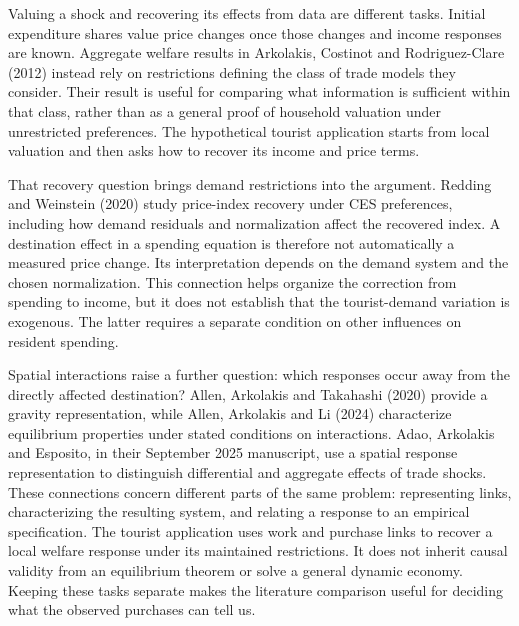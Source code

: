Valuing a shock and recovering its effects from data are different tasks. Initial
expenditure shares value price changes once those changes and income responses
are known. Aggregate welfare results in Arkolakis, Costinot and Rodriguez-Clare
(2012) instead rely on restrictions defining the class of trade models they
consider. Their result is useful for comparing what information is sufficient
within that class, rather than as a general proof of household valuation under
unrestricted preferences. The hypothetical tourist application starts from local
valuation and then asks how to recover its income and price terms.

That recovery question brings demand restrictions into the argument. Redding and
Weinstein (2020) study price-index recovery under CES preferences, including how
demand residuals and normalization affect the recovered index. A destination
effect in a spending equation is therefore not automatically a measured price
change. Its interpretation depends on the demand system and the chosen
normalization. This connection helps organize the correction from spending to
income, but it does not establish that the tourist-demand variation is exogenous.
The latter requires a separate condition on other influences on resident spending.

Spatial interactions raise a further question: which responses occur away from
the directly affected destination? Allen, Arkolakis and Takahashi (2020) provide
a gravity representation, while Allen, Arkolakis and Li (2024) characterize
equilibrium properties under stated conditions on interactions. Adao, Arkolakis
and Esposito, in their September 2025 manuscript, use a spatial response
representation to distinguish differential and aggregate effects of trade shocks.
These connections concern different parts of the same problem: representing
links, characterizing the resulting system, and relating a response to an empirical
specification. The tourist application uses work and purchase links to recover a
local welfare response under its maintained restrictions. It does not inherit
causal validity from an equilibrium theorem or solve a general dynamic economy.
Keeping these tasks separate makes the literature comparison useful for deciding
what the observed purchases can tell us.
